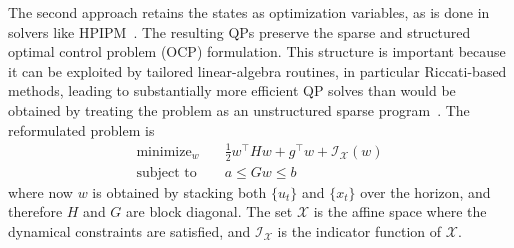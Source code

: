 \documentclass[letterpaper, 10 pt, conference]{ieeeconf}  %
\DeclareMathOperator*{\minimize}{minimize}
\begin{document}
The second approach retains the states as optimization variables, as is done in solvers like HPIPM~\cite{hpipm}. The resulting QPs preserve the sparse and structured optimal control problem (OCP) formulation. This structure is important because it can be exploited by tailored linear-algebra routines, in particular Riccati-based methods, leading to substantially more efficient QP solves than would be obtained by treating the problem as an unstructured sparse program~\cite{riccati_frison}. The reformulated problem is
\begin{equation}
\label{eq:sparse_qp}
\begin{aligned}
    \minimize_{w} &\quad \frac{1}{2} w^{\top} H w + g^{\top} w + \mathcal{I}_{\mathcal{X}}(w) \\
    \text{subject to} &\quad a \leq G w \leq b
\end{aligned}
\end{equation}
where now $w$ is obtained by stacking both $\{u_t\}$ and $\{x_t\}$ over the horizon, and therefore $H$ and $G$ are block diagonal. The set $\mathcal{X}$ is the affine space where the dynamical constraints are satisfied, and $\mathcal{I}_{\mathcal{X}}$ is the indicator function of $\mathcal{X}$.
\end{document}
